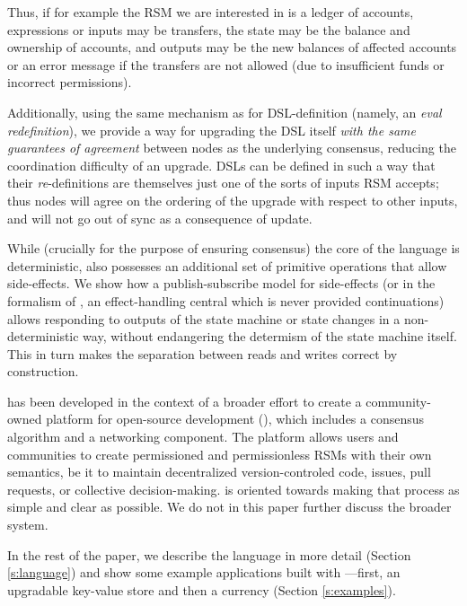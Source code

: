 Thus, if for example the RSM we are interested
in is a ledger of accounts, expressions or inputs may be transfers, the
state may be the balance and ownership of accounts, and outputs may be the new
balances of affected accounts or an error message if the transfers are not
allowed (due to insufficient funds or incorrect permissions).

Additionally, using the same mechanism as for DSL-definition (namely, an
\emph{eval redefinition}), we provide a way for upgrading the DSL itself
\emph{with the same guarantees of agreement} between nodes as the underlying
consensus, reducing the coordination difficulty of an upgrade. DSLs can be
defined in such a way that their \emph{re}-definitions are themselves just one of the
sorts of inputs RSM accepts; thus nodes will agree on the ordering of the
upgrade with respect to other inputs, and will not go out of sync as a
consequence of update.

While (crucially for the purpose of ensuring consensus) the core of the language
is deterministic, \rad{} also possesses an additional set of primitive operations
that allow side-effects. We show how a publish-subscribe model for side-effects
(or in the formalism of \cite{Cartwright1994}, an effect-handling central which
is never provided continuations) allows responding to outputs of the state
machine or state changes in a non-deterministic way, without endangering the
determism of the state machine itself. This in turn makes the separation between
reads and writes correct by construction.

\rad{} has been developed in the context of a broader effort to create a
community-owned platform for open-source development (\oscoin{}), which
includes a consensus algorithm and a networking component. The \oscoin{}
platform allows users and communities to create permissioned and permissionless
RSMs with their own semantics, be it to maintain decentralized
version-controled code, issues, pull requests, or collective decision-making.
\rad{} is
oriented towards making that process as simple and clear as possible. We do
not in this paper further discuss the broader \oscoin{} system.

In the rest of the paper, we describe the language in more detail (Section
\ref{s:language}) and show some example applications built with \rad{}---first,
an upgradable key-value store and then a currency
(Section \ref{s:examples}).
